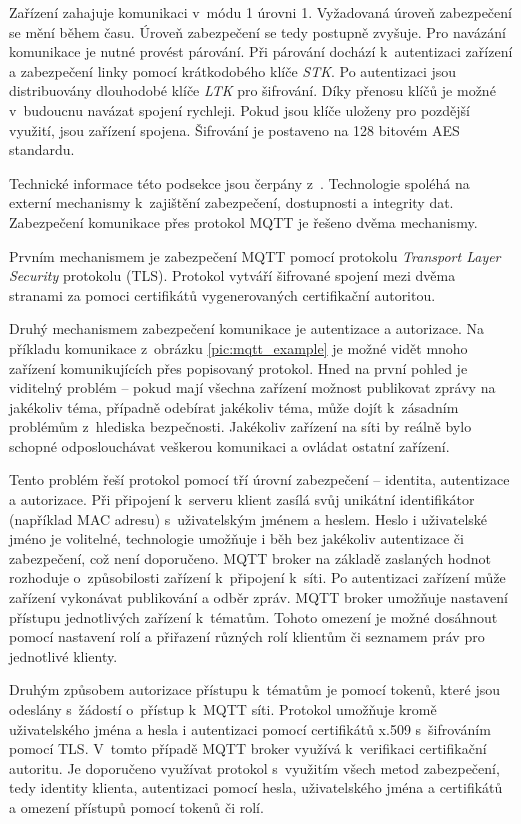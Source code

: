 Zařízení zahajuje komunikaci v~módu 1 úrovni 1. Vyžadovaná úroveň zabezpečení se mění během času. Úroveň zabezpečení se tedy postupně zvyšuje. Pro navázání komunikace je nutné provést párování. Při párování dochází k~autentizaci zařízení a zabezpečení linky pomocí krátkodobého klíče \textit{STK}. Po autentizaci jsou distribuovány dlouhodobé klíče \textit{LTK} pro šifrování. Díky přenosu klíčů je možné v~budoucnu navázat spojení rychleji. Pokud jsou klíče uloženy pro pozdější využití, jsou zařízení spojena. Šifrování je postaveno na 128 bitovém AES standardu.

Technické informace této podsekce jsou čerpány z~\cite{standard2019mqtt}. Technologie spoléhá na externí mechanismy k~zajištění zabezpečení, dostupnosti a integrity dat. Zabezpečení komunikace přes protokol MQTT je řešeno dvěma mechanismy.

Prvním mechanismem je zabezpečení MQTT pomocí protokolu \textit{Transport Layer Security} protokolu (TLS). Protokol vytváří šifrované spojení mezi dvěma stranami za pomoci certifikátů vygenerovaných certifikační autoritou.

Druhý mechanismem zabezpečení komunikace je autentizace a autorizace. Na příkladu komunikace z~obrázku \ref{pic:mqtt_example} je možné vidět mnoho zařízení komunikujících přes popisovaný protokol. Hned na první pohled je viditelný problém – pokud mají všechna zařízení možnost publikovat zprávy na jakékoliv téma, případně odebírat jakékoliv téma, může dojít k~zásadním problémům z~hlediska bezpečnosti. Jakékoliv zařízení na síti by reálně bylo schopné odposlouchávat veškerou komunikaci a ovládat ostatní zařízení.

Tento problém řeší protokol pomocí tří úrovní zabezpečení – identita, autentizace a autorizace. Při připojení k~serveru klient zasílá svůj unikátní identifikátor (například MAC adresu) s~uživatelským jménem a heslem. Heslo i uživatelské jméno je volitelné, technologie umožňuje i běh bez jakékoliv autentizace či zabezpečení, což není doporučeno. MQTT broker na základě zaslaných hodnot rozhoduje o~způsobilosti zařízení k~připojení k~síti. Po autentizaci zařízení může zařízení vykonávat publikování a odběr zpráv. MQTT broker umožňuje nastavení přístupu jednotlivých zařízení k~tématům. Tohoto omezení je možné dosáhnout pomocí nastavení rolí a přiřazení různých rolí klientům či seznamem práv pro jednotlivé klienty. 

Druhým způsobem autorizace přístupu k~tématům je pomocí tokenů, které jsou odeslány s~žádostí o~přístup k~MQTT síti. Protokol umožňuje kromě uživatelského jména a hesla i autentizaci pomocí certifikátů x.509 s~šifrováním pomocí TLS. V~tomto případě MQTT broker využívá k~verifikaci certifikační autoritu. Je doporučeno využívat protokol s~využitím všech metod zabezpečení, tedy identity klienta, autentizaci pomocí hesla, uživatelského jména a certifikátů a omezení přístupů pomocí tokenů či rolí.

